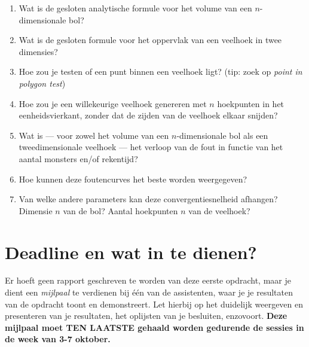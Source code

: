\documentclass[10pt,a4paper]{article}
\begin{document}
\begin{enumerate}
	\item Wat is de gesloten analytische formule voor het volume van een $n$-dimensionale bol?
	\item Wat is de gesloten formule voor het oppervlak van een veelhoek in twee dimensies?
	\item Hoe zou je testen of een punt binnen een veelhoek ligt? (tip: zoek op \emph{point in polygon test})
	\item Hoe zou je een willekeurige veelhoek genereren met $n$ hoekpunten in het eenheidsvierkant, zonder dat de zijden van de veelhoek elkaar snijden?
	\item Wat is --- voor zowel het volume van een $n$-dimensionale bol als een tweedimensionale veelhoek --- het verloop van de fout in functie van het aantal monsters en/of rekentijd?
	\item Hoe kunnen deze foutencurves het beste worden weergegeven?
	\item Van welke andere parameters kan deze convergentiesnelheid afhangen? Dimensie $n$ van de bol? Aantal hoekpunten $n$ van de veelhoek?
\end{enumerate}

\section*{Deadline en wat in te dienen?}

Er hoeft geen rapport geschreven te worden van deze eerste opdracht, maar je dient een \emph{mijlpaal} te verdienen bij \'e\'en van de assistenten, waar je je resultaten van de opdracht toont en demonstreert. Let hierbij op het duidelijk weergeven en presenteren van je resultaten, het oplijsten van je besluiten, enzovoort. \textbf{Deze mijlpaal moet TEN LAATSTE gehaald worden gedurende de sessies in de week van 3-7 oktober.}
\end{document}
